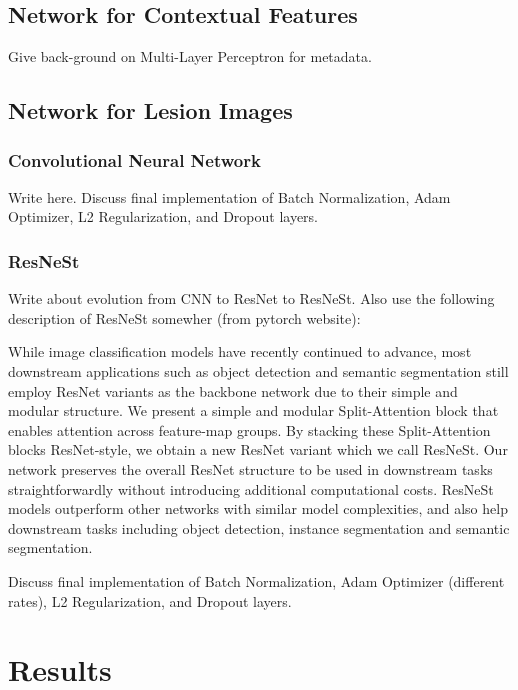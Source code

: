 \documentclass [MAS] {uclathes}
\begin{document}
\section{Network for Contextual Features}

Give back-ground on Multi-Layer Perceptron for metadata.

\section{Network for Lesion Images}

\subsection{Convolutional Neural Network}

Write here. Discuss final implementation of Batch Normalization, Adam Optimizer, L2 Regularization, and Dropout layers.

\subsection{ResNeSt}

Write about evolution from CNN to ResNet to ResNeSt. Also use the following description of ResNeSt somewher (from pytorch website):

While image classification models have recently continued to advance, most downstream applications such as object detection and semantic segmentation still employ ResNet variants as the backbone network due to their simple and modular structure. We present a simple and modular Split-Attention block that enables attention across feature-map groups. By stacking these Split-Attention blocks ResNet-style, we obtain a new ResNet variant which we call ResNeSt. Our network preserves the overall ResNet structure to be used in downstream tasks straightforwardly without introducing additional computational costs. ResNeSt models outperform other networks with similar model complexities, and also help downstream tasks including object detection, instance segmentation and semantic segmentation.

Discuss final implementation of Batch Normalization, Adam Optimizer (different rates), L2 Regularization, and Dropout layers.


\chapter{Results}
\end{document}

